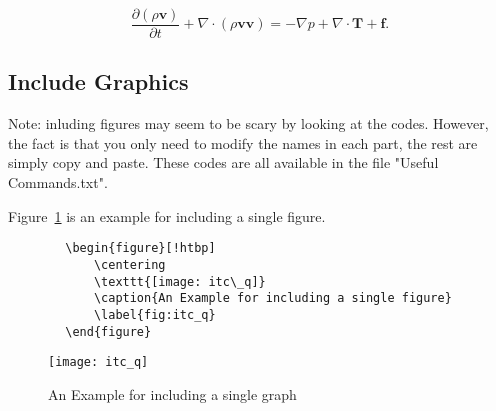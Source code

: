 \begin{equation}\label{eq:N-S_equation}
    \frac{\partial (\rho\mathbf{v})}{\partial t} + \nabla \cdot (\rho \mathbf{v} \mathbf{v}) = -\nabla p + \nabla \cdot\mathbf{T} + \mathbf{f}. 
\end{equation}    

\subsection{Include Graphics}
Note: inluding figures may seem to be scary by looking at the codes. However, the fact is that you only need to modify the names in each part, the rest are simply copy and paste. These codes are all available in the file "Useful Commands.txt".

Figure~\ref{fig:itc_q} is an example for including a single figure.
\begin{center}
    \small
    \begin{verbatim}
        \begin{figure}[!htbp]
            \centering
            \texttt{[image: itc\_q]}
            \caption{An Example for including a single figure}
            \label{fig:itc_q}
        \end{figure}
    \end{verbatim}
\end{center}

\begin{figure}[!htbp]
    \centering
    \texttt{[image: itc\_q]}
    \caption{An Example for including a single graph}
    \label{fig:itc_q}
\end{figure}

